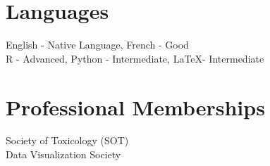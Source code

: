 \documentclass[margin,line]{res}
\begin{document}
\begin{resume}
\vspace*{.1in}

\section{\sc Languages}

English - Native Language, French - Good\\
R - Advanced, Python - Intermediate, LaTeX- Intermediate

\vspace*{.1in}

\section{\sc Professional Memberships}
Society of Toxicology (SOT)\\
Data Visualization Society\\


\end{resume}
\end{document}
